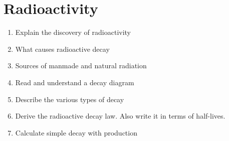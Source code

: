 \documentclass{article}
\begin{document}
\section{Radioactivity}

\begin{enumerate}
	\item{Explain the discovery of radioactivity}
	\item{What causes radioactive decay}
	\item{Sources of manmade and natural radiation}
	\item{Read and understand a decay diagram}
	\item{Describe the various types of decay}
	\item{Derive the radioactive decay law. Also write it in terms of half-lives.}
	\item{Calculate simple decay with production} 
\end{enumerate}	
\end{document}
